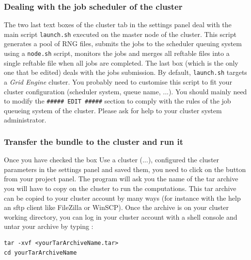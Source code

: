 \subsubsection{Dealing with the job scheduler of the cluster}


The two last text boxes of the cluster tab in the settings panel deal with the main script \texttt{launch.sh} executed on the master node of the cluster. This script  generates a pool of RNG files, submits the jobs to the scheduler queuing system using a \texttt{node.sh} script, monitors the jobs and merges all reftable files into a single reftable file when all jobs are completed.
The last box (which is the only one that be edited) deals with the jobs submission. By default, \texttt{launch.sh} targets a \textit{Grid Engine} cluster. You probably need to customise this script to fit your cluster configuration (scheduler system, queue name, ...). You should mainly need to modify the  \texttt{\#\#\#\#\# EDIT \#\#\#\#\#} section to comply with the rules of the job queueing system of the cluster. Please ask for help to your cluster system administrator.


\subsubsection{Transfer the bundle to the cluster and run it}\label{clusterrun}
Once you have checked the box \textsf{Use a cluster (...)}, configured the cluster parameters in the settings panel and saved them, you need to click on the  button from your project panel. The program will ask you the name of the tar archive you will have to copy on the cluster to run the computations. This tar archive can be copied to your cluster account by many ways (for instance with the help an sftp client like FileZilla or WinSCP). Once the archive is on your cluster working directory, you can log in your cluster account with a shell console and untar your archive by typing :\\
   \begin{minipage}{0.9\textwidth}
\begin{lstlisting}
tar -xvf <yourTarArchiveName.tar>
cd yourTarArchiveName
\end{lstlisting}
   \end{minipage}\\

